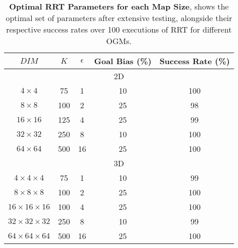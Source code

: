 
\begin{table}[H]
\begin{centering}
\begin{tabular}{|c|c|c|c|c|}
\hline
$DIM$ & $K$ & $\epsilon$ & Goal Bias (\%) & Success Rate (\%) \\
\hline
\hline
\multicolumn{5}{|c|}{2D} \\
\hline
$4\times 4$ & 75 & 1 & 10 & 100 \\
\hline
$8\times 8$ & 100 & 2 & 25 & 98 \\
\hline
$16\times 16$ & 125 & 4 & 25 & 99 \\
\hline
$32\times 32$ & 250 & 8 & 10 & 100 \\
\hline
$64\times 64$ & 500 & 16 & 25 & 100 \\
\hline
\hline
\multicolumn{5}{|c|}{3D} \\
\hline
$4\times 4 \times 4$ & 75 & 1 & 10 & 99 \\
\hline
$8\times 8 \times 8$ & 100 & 2 & 25 & 100 \\
\hline
$16\times 16 \times 16$ & 100 & 4 & 25 & 100 \\
\hline
$32\times 32 \times 32$ & 250 & 8 & 10 & 99 \\
\hline
$64\times 64 \times 64$ & 500 & 16 & 25 & 100 \\
\hline
\end{tabular}
\caption[Optimal RRT Parameters for each Map Size]{\textbf{Optimal RRT Parameters for each Map Size}, shows the optimal set of parameters after extensive testing, alongside their respective success rates over 100 executions of \gls{RRT} for different \glspl{OGM}.}
\label{table:optimal_params}
\end{centering}
\end{table}